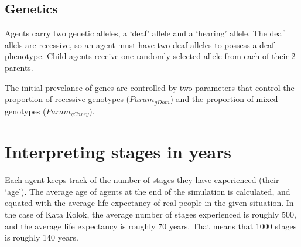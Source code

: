\documentclass[11pt, oneside]{article}
\begin{document}
\subsection{Genetics}
Agents carry two genetic alleles, a `deaf' allele and a `hearing' allele.  The deaf allels are recessive, so an agent must have two deaf alleles to possess a deaf phenotype.  Child agents receive one randomly selected allele from each of their 2 parents.

The initial prevelance of genes are controlled by two parameters that control the proportion of recessive genotypes ($Param_{gDom}$) and the proportion of mixed genotypes ($Param_{gCarry}$).

\section{Interpreting stages in years}
Each agent keeps track of the number of stages they have experienced (their `age').  The average age of agents at the end of the simulation is calculated, and equated with the average life expectancy of real people in the given situation.  In the case of Kata Kolok, the average number of stages experienced is roughly 500, and the average life expectancy is roughly 70 years.  That means that 1000 stages is roughly 140 years.
\end{document}
